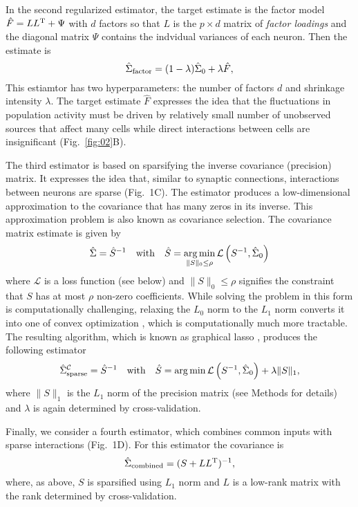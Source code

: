 In the second regularized estimator, the target estimate is the factor model $\hat F = LL^{\rm T} + \Psi$ with $d$ factors so that $L$ is the $p\times d$ matrix of \emph{factor loadings} and the diagonal matrix $\Psi$ contains the indvidual variances of each neuron.
Then the estimate is 
\begin{equation}
\hat \Sigma_{\rm factor} = (1-\lambda) \hat \Sigma_0 + \lambda \hat F,
\end{equation}
This estiamtor has two hyperparameters: the number of factors $d$ and shrinkage intensity $\lambda$. The target estimate $\hat F$ expresses the idea that the fluctuations in population activity must be driven by relatively small number of unobserved sources that affect many cells while direct interactions between cells are insignificant (Fig.~\ref{fig:02}B).   

The third estimator is based on sparsifying the inverse covariance (precision) matrix. It expresses the idea that, similar to synaptic connections, interactions between neurons are sparse (Fig.~1C). The estimator produces a low-dimensional approximation to the covariance that has many zeros in its inverse. This approximation problem is also known as covariance selection. The covariance matrix estimate is given by
\begin{equation}
\hat\Sigma = \hat S^{-1}
\quad\mbox{with}\quad
\hat S = \operatorname*{arg\,min}\limits_{\|S\|_0 \le \rho} \mathcal L\left(S^{-1},\hat\Sigma_0\right)   
\end{equation}
where $\mathcal L$ is a loss function (see below) and $\|S\|_0\le\rho$ signifies the constraint that $S$ has at most $\rho$ non-zero coefficients. While solving the problem in this form is computationally challenging, relaxing the $L_0$ norm to the $L_1$ norm converts it into one of convex optimization \cite{Donoho:2000}, which is computationally much more tractable. The resulting algorithm, which is known as graphical lasso \cite{Meinshausen:2006,Yuan:2007,Banerjee:2008,Friedman:2008}, produces the following estimator  
\begin{equation}
\hat\Sigma_{\rm sparse}^\mathcal{C} = \hat S^{-1}
\quad\mbox{with}\quad
\hat S = \operatorname*{arg\,min} \mathcal L\left(S^{-1},\hat\Sigma_0\right) + \lambda \|S\|_1,
\end{equation}
where $\|S\|_1$ is the $L_1$ norm of the precision matrix (see Methods for details) and $\lambda$ is again determined by cross-validation.

Finally, we consider a fourth estimator, which combines common inputs with sparse interactions (Fig.~1D). For this estimator the covariance is
\begin{equation}
\hat\Sigma_{\rm combined} = (S + LL^{\rm T})^{-1},
\end{equation}
where, as above, $S$ is sparsified using $L_1$ norm and $L$ is a low-rank matrix with the rank determined by cross-validation.




